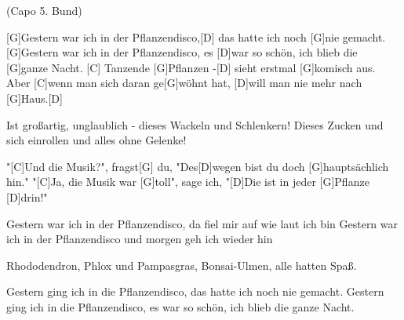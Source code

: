 
{ \footnotesize(Capo 5. Bund)}

\begin{guitar}
	[G]Gestern war ich in der Pflanzendisco,[D] das hatte ich noch [G]nie gemacht.
	[G]Gestern war ich in der Pflanzendisco, es [D]war so schön, ich blieb die [G]ganze Nacht.
	[C] Tanzende [G]Pflanzen -[D] sieht erstmal [G]komisch aus.
	Aber [C]wenn man sich daran ge[G]wöhnt hat, [D]will man nie mehr nach [G]Haus.[D]{}
	
	Ist großartig, unglaublich - dieses Wackeln und Schlenkern!
	Dieses Zucken und sich einrollen und alles ohne Gelenke!
	
	"[C]Und die Musik?", fragst[G] du, "Des[D]wegen bist du doch [G]hauptsächlich hin."
	"[C]Ja, die Musik war [G]toll", sage ich, "[D]Die ist in jeder [G]Pflanze [D]drin!"
	
	 
	
	Gestern war ich in der Pflanzendisco, da fiel mir auf wie laut ich bin
	Gestern war ich in der Pflanzendisco und morgen geh ich wieder hin
	
	Rhododendron, Phlox und Pampasgras,
	Bonsai-Ulmen, alle hatten Spaß.
	
	Gestern ging ich in die Pflanzendisco, das hatte ich noch nie gemacht.
	Gestern ging ich in die Pflanzendisco, es war so schön, ich blieb die ganze Nacht.
	
	 
\end{guitar}